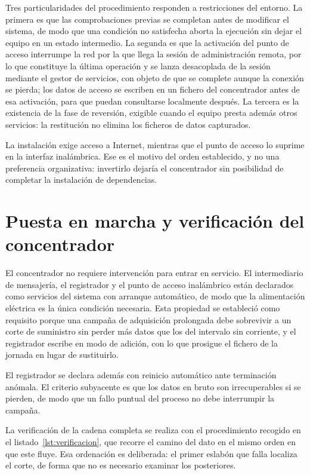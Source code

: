 Tres particularidades del procedimiento responden a restricciones del entorno. La primera es
que las comprobaciones previas se completan antes de modificar el sistema, de modo que una
condición no satisfecha aborta la ejecución sin dejar el equipo en un estado intermedio. La
segunda es que la activación del punto de acceso interrumpe la red por la que llega la sesión
de administración remota, por lo que constituye la última operación y se lanza desacoplada de
la sesión mediante el gestor de servicios, con objeto de que se complete aunque la conexión se
pierda; los datos de acceso se escriben en un fichero del concentrador antes de esa
activación, para que puedan consultarse localmente después. La tercera es la existencia de la
fase de reversión, exigible cuando el equipo presta además otros servicios: la
restitución no elimina los ficheros de datos capturados.

La instalación exige acceso a Internet, mientras que el punto de acceso lo suprime en la
interfaz inalámbrica. Ese es el motivo del orden establecido, y no una preferencia
organizativa: invertirlo dejaría el concentrador sin posibilidad de completar la instalación
de dependencias.

\section{Puesta en marcha y verificación del concentrador}

El concentrador no requiere intervención para entrar en servicio. El intermediario de
mensajería, el registrador y el punto de acceso inalámbrico están declarados como servicios
del sistema con arranque automático, de modo que la alimentación eléctrica es la única
condición necesaria. Esta propiedad se estableció como requisito porque una campaña de
adquisición prolongada debe sobrevivir a un corte de suministro sin perder más datos que los
del intervalo sin corriente, y el registrador escribe en modo de adición, con lo que
prosigue el fichero de la jornada en lugar de sustituirlo.

El registrador se declara además con reinicio automático ante terminación anómala. El
criterio subyacente es que los datos en bruto son irrecuperables si se pierden, de modo que
un fallo puntual del proceso no debe interrumpir la campaña.

La verificación de la cadena completa se realiza con el procedimiento recogido en el
listado~\ref{lst:verificacion}, que recorre el camino del dato en el mismo orden en que este
fluye. Esa ordenación es deliberada: el primer eslabón que falla localiza el corte, de forma
que no es necesario examinar los posteriores.

